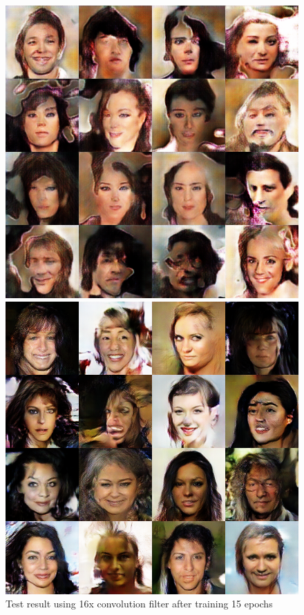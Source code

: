 \begin{figure}
    \begin{minipage}[t]{0.48\linewidth}
        \centering
        \includegraphics[width=\textwidth]{figures/result_conv_filter_16.png}
        \caption{Test result using 16x convolution filter after training 15 epochs}
        \label{conv_filter_16}
    \end{minipage}
        \hfill
    \begin{minipage}[t]{0.48\linewidth}
        \centering
        \includegraphics[width=\textwidth]{figures/result_conv_filter_24.png}

\end{minipage}
\end{figure}
